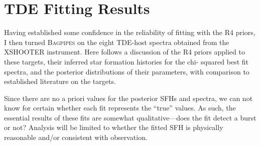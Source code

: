 \documentclass[a4paper,12pt]{article}
\begin{document}
%

\newpage
\section{TDE Fitting Results}\label{sec:tde_fitting}

Having established some confidence in the reliability of fitting with the R4
priors, I then turned \textsc{Bagpipes} on the eight TDE-host spectra obtained
from the XSHOOTER instrument. Here follows a discussion of the R4 priors
applied to these targets, their inferred star formation histories for the chi-
squared best fit spectra, and the posterior distributions of their parameters,
with comparison to established literature on the targets.

Since there are no a priori values for the posterior SFHs and spectra, we can
not know for certain whether each fit represents the ``true'' values. As such,
the essential results of these fits are somewhat qualitative---does the fit
detect a burst or not? Analysis will be limited to whether the fitted SFH is
physically reasonable and/or consistent with observation.

\newpage
\end{document}
